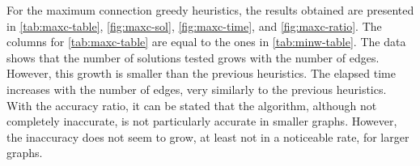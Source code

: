 For the maximum connection greedy heuristics, the results obtained are presented in \autoref{tab:maxc-table}, \autoref{fig:maxc-sol}, \autoref{fig:maxc-time}, and \autoref{fig:maxc-ratio}. 
The columns for \autoref{tab:maxc-table} are equal to the ones in \autoref{tab:minw-table}.
The data shows that the number of solutions tested grows with the number of edges.
However, this growth is smaller than the previous heuristics.
The elapsed time increases with the number of edges, very similarly to the previous heuristics.
With the accuracy ratio, it can be stated that the algorithm, although not completely inaccurate, is not particularly accurate in smaller graphs.
However, the inaccuracy does not seem to grow, at least not in a noticeable rate, for larger graphs.


\begin{table}[ht!]
\caption{Results from maximum connection greedy algorithm}
\label{tab:maxc-table}
\end{table}
